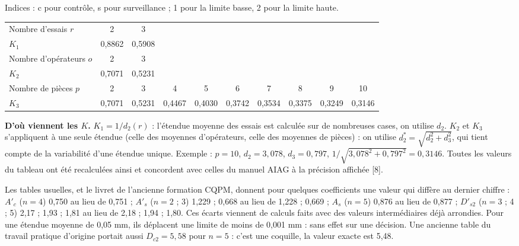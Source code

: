 \documentclass[11pt,a4paper]{article}
\begin{document}
\smallskip
{\small Indices : c pour contrôle, s pour surveillance ; 1 pour la limite basse, 2 pour la limite haute.}

\begin{center}
\label{tab:K}
\small
\begin{tabular}{@{}lccccccccc@{}}\toprule
Nombre d'essais $r$ & 2 & 3 &&&&&&&\\
$K_1$ & 0,8862 & 0,5908 &&&&&&&\\\midrule
Nombre d'opérateurs $o$ & 2 & 3 &&&&&&&\\
$K_2$ & 0,7071 & 0,5231 &&&&&&&\\\midrule
Nombre de pièces $p$ & 2 & 3 & 4 & 5 & 6 & 7 & 8 & 9 & 10\\
$K_3$ & 0,7071 & 0,5231 & 0,4467 & 0,4030 & 0,3742 & 0,3534 & 0,3375 & 0,3249 & 0,3146\\\bottomrule
\end{tabular}
\end{center}
\textbf{D'où viennent les $K$.} $K_1=1/d_2(r)$ : l'étendue moyenne des essais est calculée sur de nombreuses cases, on utilise $d_2$. $K_2$ et $K_3$ s'appliquent à une seule étendue (celle des moyennes d'opérateurs, celle des moyennes de pièces) : on utilise $d_2^*=\sqrt{d_2^2+d_3^2}$, qui tient compte de la variabilité d'une étendue unique. Exemple : $p=10$, $d_2=3{,}078$, $d_3=0{,}797$, $1/\sqrt{3{,}078^2+0{,}797^2}=0{,}3146$. Toutes les valeurs du tableau ont été recalculées ainsi et concordent avec celles du manuel AIAG à la précision affichée [8].

\begin{note}
Les tables usuelles, et le livret de l'ancienne formation CQPM, donnent pour quelques coefficients une valeur qui diffère au dernier chiffre : $A'_c$ ($n=4$) 0,750 au lieu de 0,751 ; $A'_s$ ($n=2$ ; 3) 1,229 ; 0,668 au lieu de 1,228 ; 0,669 ; $A_s$ ($n=5$) 0,876 au lieu de 0,877 ; $D'_{s2}$ ($n=3$ ; 4 ; 5) 2,17 ; 1,93 ; 1,81 au lieu de 2,18 ; 1,94 ; 1,80. Ces écarts viennent de calculs faits avec des valeurs intermédiaires déjà arrondies. Pour une étendue moyenne de 0,05 mm, ils déplacent une limite de moins de 0,001 mm : sans effet sur une décision. Une ancienne table du travail pratique d'origine portait aussi $D_{c2}=5{,}58$ pour $n=5$ : c'est une coquille, la valeur exacte est 5,48.
\end{note}

\clearpage
\end{document}
